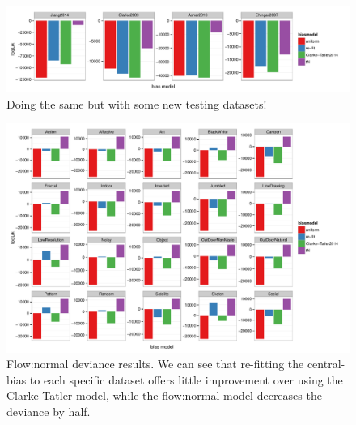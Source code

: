 \begin{figure}
\centering
\includegraphics[width=12cm]{../scripts/flow/figs/llh_testing.pdf}
\caption{Doing the same but with some new testing datasets!}
\label{fig:nFlowDevAll2}
\end{figure}

\begin{figure}
\centering
 \includegraphics[width=12cm]{../scripts/flow/figs/llh_Borji.pdf}
\caption{Flow:normal deviance results. We can see that re-fitting the central-bias to each specific dataset offers little improvement over using the Clarke-Tatler model, while the flow:normal model decreases the deviance by half.}
\label{fig:nFlowDevBorji}
\end{figure}

